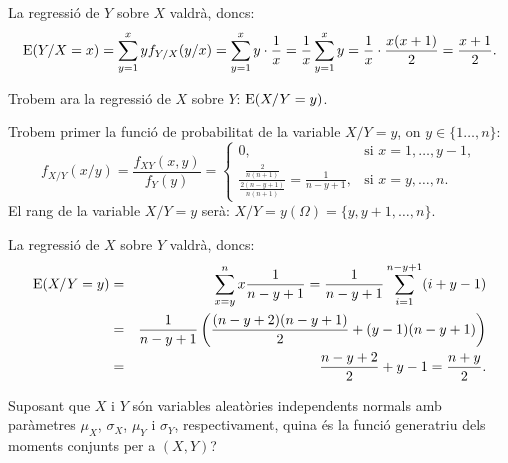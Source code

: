 {La regressi\'o de $Y$ sobre $X$ valdr\`a, doncs:
\[
{\rm E} (Y/X=x)=\sum_{y=1}^x y f_{Y/X}(y/x)=\sum_{y=1}^x y\cdot 
\frac{1}{x}=\frac{1}{x}\sum_{y=1}^x y =\frac{1}{x}\cdot\frac{x 
(x+1)}{2}=\frac{x+1}{2}.
\]

Trobem ara la regressi\'o de $X$ sobre $Y$: ${\rm E} (X/Y=y)$.

Trobem primer la funci\'o de probabilitat de la variable $X/Y=y$, on 
\mbox{$y\in\{1\ldots,n\}$:}
\[
f_{X/Y}(x/y)=\frac{f_{XY}(x,y)}{f_Y(y)}=
\left\{\begin{array}{ll}
0, & \text{si $x=1,\ldots, 
y-1$}, \\
\frac{\frac{2}{n (n+1)}}{\frac{2 (n-y+1)}{n 
(n+1)}}=\frac{1}{n-y +1}, & \text{si $x=y,\ldots, n$.}
\end{array}\right.
\]
El rang de la variable $X/Y=y$ ser\`a: \mbox{$X/Y=y (\Omega)=\{y,y+1,\ldots,n\}$.}

La regressi\'o de $X$ sobre $Y$ valdr\`a, doncs:
\begin{eqnarray*}
{\rm E} (X/Y=y) & = & \sum_{x=y}^n x \frac{1}{n-y+1}=\frac{1}{n-y+1} 
\sum_{i=1}^{n-y+1} (i+y-1) \\ & = &\frac{1}{n-y+1} 
\left(\frac{(n-y+2)(n-y+1)}{2}+(y-1) (n-y+1)\right) \\ & = & \frac{n-y+2}{2}+y-1 
=\frac{n+y}{2}.
\end{eqnarray*}}

\begin{probres}
{Suposant que $X$ i $Y$
s\'on variables aleat\`ories independents normals amb par\`ametres $\mu_X$,
$\sigma_X$, $\mu_Y$ i $\sigma_Y$, respectivament, quina \'es la funci\'o
generatriu
dels moments conjunts per a $(X,Y)$?}
\end{probres}


